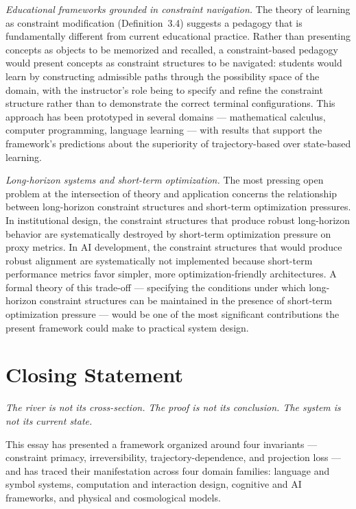 \documentclass[12pt, twoside]{article}
\theoremstyle{plain}
\theoremstyle{definition}
\theoremstyle{remark}
\begin{document}
\textit{Educational frameworks grounded in constraint navigation.}
The theory of learning as constraint modification (Definition~3.4)
suggests a pedagogy that is fundamentally different from
current educational practice.
Rather than presenting concepts as objects to be memorized and
recalled, a constraint-based pedagogy would present concepts as
constraint structures to be navigated:
students would learn by constructing admissible paths through
the possibility space of the domain, with the instructor's role
being to specify and refine the constraint structure rather than
to demonstrate the correct terminal configurations.
This approach has been prototyped in several domains —
mathematical calculus, computer programming, language learning —
with results that support the framework's predictions about
the superiority of trajectory-based over state-based learning.

\textit{Long-horizon systems and short-term optimization.}
The most pressing open problem at the intersection of theory
and application concerns the relationship between long-horizon
constraint structures and short-term optimization pressures.
In institutional design, the constraint structures that produce
robust long-horizon behavior are systematically destroyed by
short-term optimization pressure on proxy metrics.
In AI development, the constraint structures that would produce
robust alignment are systematically not implemented because
short-term performance metrics favor simpler, more
optimization-friendly architectures.
A formal theory of this trade-off — specifying the conditions
under which long-horizon constraint structures can be maintained
in the presence of short-term optimization pressure —
would be one of the most significant contributions the present
framework could make to practical system design.

\newpage

\section{Closing Statement}

\epigraph{\itshape
  The river is not its cross-section. The proof is not its conclusion.
  The system is not its current state.}{}

This essay has presented a framework organized around four invariants —
constraint primacy, irreversibility, trajectory-dependence, and
projection loss — and has traced their manifestation across four
domain families: language and symbol systems, computation and
interaction design, cognitive and AI frameworks, and physical
and cosmological models.
\end{document}
